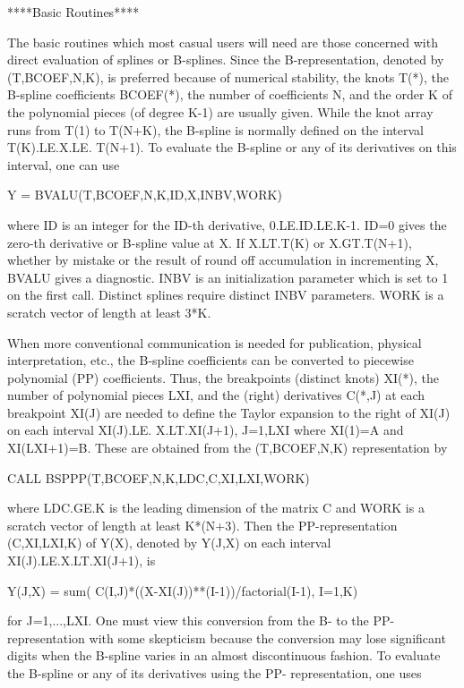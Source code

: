 \documentclass[11pt,twoside,nolof]{starlink}
\begin{document}
\begin{terminalv}
                     ****Basic Routines****

     The basic routines which most casual users will need are those
     concerned with direct evaluation of splines or B-splines.
     Since the B-representation, denoted by (T,BCOEF,N,K), is
     preferred because of numerical stability, the knots T(*), the
     B-spline coefficients BCOEF(*), the number of coefficients N,
     and the order K of the polynomial pieces (of degree K-1) are
     usually given.  While the knot array runs from T(1) to T(N+K),
     the B-spline is normally defined on the interval T(K).LE.X.LE.
     T(N+1).  To evaluate the B-spline or any of its derivatives
     on this interval, one can use

                  Y = BVALU(T,BCOEF,N,K,ID,X,INBV,WORK)

     where ID is an integer for the ID-th derivative, 0.LE.ID.LE.K-1.
     ID=0 gives the zero-th derivative or B-spline value at X.
     If X.LT.T(K) or X.GT.T(N+1), whether by mistake or the result
     of round off accumulation in incrementing X, BVALU gives a
     diagnostic.  INBV is an initialization parameter which is set
     to 1 on the first call.  Distinct splines require distinct
     INBV parameters.  WORK is a scratch vector of length at least
     3*K.

     When more conventional communication is needed for publication,
     physical interpretation, etc., the B-spline coefficients can
     be converted to piecewise polynomial (PP) coefficients.  Thus,
     the breakpoints (distinct knots) XI(*), the number of
     polynomial pieces LXI, and the (right) derivatives C(*,J) at
     each breakpoint XI(J) are needed to define the Taylor
     expansion to the right of XI(J) on each interval XI(J).LE.
     X.LT.XI(J+1), J=1,LXI where XI(1)=A and XI(LXI+1)=B.
     These are obtained from the (T,BCOEF,N,K) representation by

                CALL BSPPP(T,BCOEF,N,K,LDC,C,XI,LXI,WORK)

     where LDC.GE.K is the leading dimension of the matrix C and
     WORK is a scratch vector of length at least K*(N+3).
     Then the PP-representation (C,XI,LXI,K) of Y(X), denoted
     by Y(J,X) on each interval XI(J).LE.X.LT.XI(J+1), is

     Y(J,X) = sum( C(I,J)*((X-XI(J))**(I-1))/factorial(I-1), I=1,K)

     for J=1,...,LXI.  One must view this conversion from the B-
     to the PP-representation with some skepticism because the
     conversion may lose significant digits when the B-spline
     varies in an almost discontinuous fashion.  To evaluate
     the B-spline or any of its derivatives using the PP-
     representation, one uses


\end{terminalv}
\end{document}
